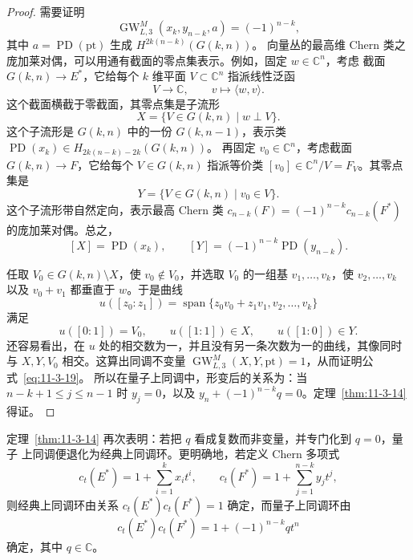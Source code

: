 \begin{proof}
需要证明
\[
  \operatorname{GW}_{L,3}^M(x_k,y_{n-k},a)=(-1)^{n-k},
\]
其中 $a=\operatorname{PD}(\mathrm{pt})$ 生成 $H^{2k(n-k)}(G(k,n))$。
向量丛的最高维 Chern
类之庞加莱对偶，可以用通有截面的零点集表示。例如，固定 $w\in\mathbb C^n$，考虑
截面 $G(k,n)\to E^*$，它给每个 $k$ 维平面 $V\subset\mathbb C^n$ 指派线性泛函
\[
  V\longrightarrow\mathbb C,\qquad v\longmapsto\langle w,v\rangle.
\]
这个截面横截于零截面，其零点集是子流形
\[
  X=\{V\in G(k,n)\mid w\perp V\}.
\]
这个子流形是 $G(k,n)$ 中的一份 $G(k,n-1)$，表示类
$\operatorname{PD}(x_k)\in H_{2k(n-k)-2k}(G(k,n))$。
再固定 $v_0\in\mathbb C^n$，考虑截面
$G(k,n)\to F$，它给每个 $V\in G(k,n)$ 指派等价类
$[v_0]\in\mathbb C^n/V=F_V$。其零点集是
\[
  Y=\{V\in G(k,n)\mid v_0\in V\}.
\]
这个子流形带自然定向，表示最高 Chern 类
$c_{n-k}(F)=(-1)^{n-k}c_{n-k}(F^*)$ 的庞加莱对偶。总之，
\[
  [X]=\operatorname{PD}(x_k),
  \qquad
  [Y]=(-1)^{n-k}\operatorname{PD}(y_{n-k}).
\]

任取 $V_0\in G(k,n)\setminus X$，使 $v_0\notin V_0$，并选取 $V_0$ 的一组基
$v_1,\ldots,v_k$，使 $v_2,\ldots,v_k$ 以及 $v_0+v_1$ 都垂直于 $w$。于是曲线
\[
  u([z_0:z_1])=\operatorname{span}
  \{z_0v_0+z_1v_1,v_2,\ldots,v_k\}
\]
满足
\[
  u([0:1])=V_0,\qquad u([1:1])\in X,\qquad u([1:0])\in Y.
\]
还容易看出，在 $u$ 处的相交数为一，并且没有另一条次数为一的曲线，其像同时与
$X,Y,V_0$ 相交。这算出同调不变量
$\operatorname{GW}_{L,3}^M(X,Y,\mathrm{pt})=1$，从而证明公式~\eqref{eq:11-3-19}。
所以在量子上同调中，形变后的关系为：当 $n-k+1\leq j\leq n-1$ 时 $y_j=0$，以及
$y_n+(-1)^{n-k}q=0$。定理~\ref{thm:11-3-14} 得证。
\end{proof}

定理~\ref{thm:11-3-14} 再次表明：若把 $q$ 看成复数而非变量，并专门化到 $q=0$，量子
上同调便退化为经典上同调环。更明确地，若定义 Chern 多项式
\[
  c_t(E^*)=1+\sum_{i=1}^kx_it^i,
  \qquad
  c_t(F^*)=1+\sum_{j=1}^{n-k}y_jt^j,
\]
则经典上同调环由关系 $c_t(E^*)c_t(F^*)=1$ 确定，而量子上同调环由
\begin{equation}\label{eq:11-3-21}
  c_t(E^*)c_t(F^*)=1+(-1)^{n-k}qt^n
\end{equation}
确定，其中 $q\in\mathbb C$。


